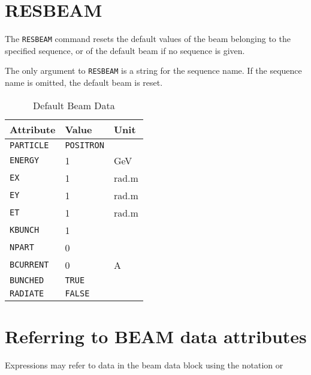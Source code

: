 \section{RESBEAM}
\label{sec:resbeam}

The {\tt RESBEAM} command resets the default values of the beam belonging to
the specified sequence, or of the default beam if no sequence is given.  


The only argument to {\tt RESBEAM} is a string for the sequence name.
If the sequence name is omitted, the default beam is reset. 

\begin{table}[h]
  \caption{Default Beam Data}
  \vspace{1ex}
  \begin{center}
     \begin{tabular}{|l|l|l|}
       \hline
       {\bf Attribute}   &  {\bf Value} & {\bf Unit}  \\
       \hline
       \texttt{PARTICLE} &  \texttt{POSITRON} & \\
       \texttt{ENERGY}   &  1           & GeV \\
       \texttt{EX}       &  1           & rad.m \\
       \texttt{EY}       &  1           & rad.m \\
       \texttt{ET}       &  1           & rad.m \\
       \texttt{KBUNCH}   &  1           & \\
       \texttt{NPART}    &  0           & \\
       \texttt{BCURRENT} &  0           & A \\
       \texttt{BUNCHED}  &  \texttt{TRUE}  & \\
       \texttt{RADIATE}  &  \texttt{FALSE} & \\     
       \hline
     \end{tabular}
  \end{center}
\end{table}


\section{Referring to BEAM data attributes}
 
Expressions may refer to data in the beam data block using the
notation  
or 

